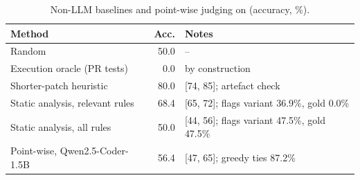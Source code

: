 \begin{table}[t]
\caption{Non-LLM baselines and point-wise judging on \RJB{} (accuracy, \%).}
\label{tab:baselines}
\centering\footnotesize
\begin{tabular}{@{}lrl@{}}
\toprule
Method & Acc. & Notes \\
\midrule
Random & 50.0 & -- \\
Execution oracle (PR tests) & 0.0 & by construction \\
Shorter-patch heuristic & 80.0 & [74, 85]; artefact check \\
Static analysis, relevant rules & 68.4 & [65, 72]; flags variant 36.9\%, gold 0.0\% \\
Static analysis, all rules & 50.0 & [44, 56]; flags variant 47.5\%, gold 47.5\% \\
Point-wise, Qwen2.5-Coder-1.5B & 56.4 & [47, 65]; greedy ties 87.2\% \\
\bottomrule
\end{tabular}
\end{table}
